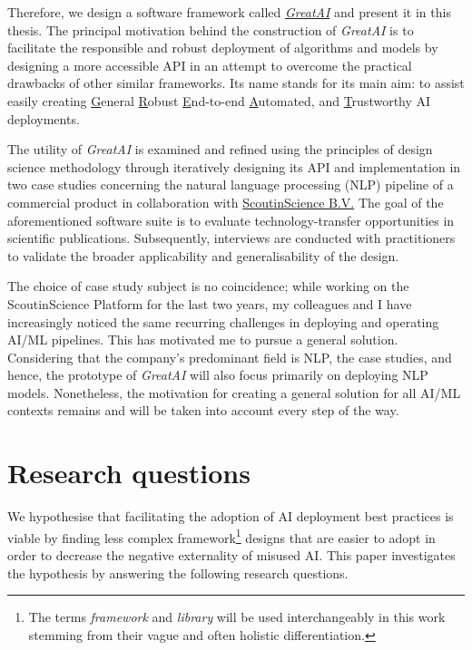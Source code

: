 Therefore, we design a software framework called \href{https://github.com/schmelczer/great-ai}{\textit{GreatAI}} and present it in this thesis. The principal motivation behind the construction of \textit{GreatAI} is to facilitate the responsible and robust deployment of algorithms and models by designing a more accessible API in an attempt to overcome the practical drawbacks of other similar frameworks. Its name stands for its main aim: to assist easily creating \underline{G}eneral \underline{R}obust \underline{E}nd-to-end \underline{A}utomated, and \underline{T}rustworthy AI deployments.

The utility of \textit{GreatAI} is examined and refined using the principles of design science methodology \cite{wieringa2014design} through iteratively designing its API and implementation in two case studies concerning the natural language processing (NLP) pipeline of a commercial product in collaboration with \href{https://scoutinscience.com/}{ScoutinScience B.V.} The goal of the aforementioned software suite is to evaluate technology-transfer opportunities in scientific publications. Subsequently, interviews are conducted with practitioners to validate the broader applicability and generalisability of the design.

The choice of case study subject is no coincidence; while working on the ScoutinScience Platform for the last two years, my colleagues and I have increasingly noticed the same recurring challenges in deploying and operating AI/ML pipelines. This has motivated me to pursue a general solution. Considering that the company's predominant field is NLP, the case studies, and hence, the prototype of \textit{GreatAI} will also focus primarily on deploying NLP models. Nonetheless, the motivation for creating a general solution for all AI/ML contexts remains and will be taken into account every step of the way.

\section{Research questions}

We hypothesise that facilitating the adoption of AI deployment best practices is viable by finding less complex framework\footnote{The terms \textit{framework} and \textit{library} will be used interchangeably in this work stemming from their vague and often holistic differentiation.} designs that are easier to adopt in order to decrease the negative externality of misused AI. This paper investigates the hypothesis by answering the following research questions. 


